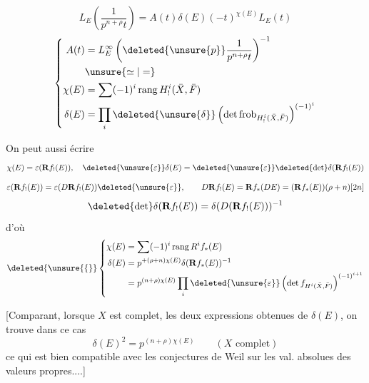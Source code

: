 \[\boxed{L_E\left(\frac1{p^{n+\rho}t}\right)=A(t)\delta(E)(-t)^{\chi(E)}L_E(t)}\]
\[
\left\{\begin{aligned}
A(t)&=L_E^\infty\left(\deleted{\unsure{p}}\frac1{p^{n+\rho}t}\right)^{-1}\\
&\unsure{\simeq|=}\\
\chi(E)&=\sum(-1)^i\operatorname{rang}H^i_!(\bar X,\bar F)\\
\delta(E)&=\prod_i\deleted{\unsure{\delta}}\left(\det\operatorname{frob}_{H^i_!(\bar X,\bar F)}\right)^{(-1)^i}
\end{aligned}\right.
\]

On peut aussi écrire
\[\chi(E)=\varepsilon(\mathbf R f_!(E)),\quad\deleted{\unsure{\varepsilon}}\delta(E)=\deleted{\unsure{\varepsilon}}\deleted{\det}\delta(\mathbf R f_!(E))\]
\[\varepsilon(\mathbf R f_!(E))=\varepsilon(D\mathbf R f_!(E))\deleted{\unsure{\varepsilon}},\qquad D\mathbf R f_!(E)=\mathbf R f_*(DE)=(\mathbf R f_*(E))(\rho+n)[2n]\]
\[\deleted{\det}\delta(\mathbf R f_!(E))=\delta(D(\mathbf R f_!(E)))^{-1}\]
d'où 
\[
\deleted{\unsure{\{}}\left\{\begin{aligned}
\chi(E)&=\sum(-1)^i\operatorname{rang}R^i f_*(E)\\
\delta(E)&=p^{+(\rho+n)\chi(E)}\delta(\mathbf R f_*(E))^{-1}\\
&=p^{(n+\rho)\chi(E)}\prod_i\deleted{\unsure{\varepsilon}}\left(\det f_{H^i(\bar X,\bar F)}\right)^{(-1)^{i+1}}
\end{aligned}\right.
\]

[Comparant, lorsque $X$ est complet, les deux expressions obtenues de $\delta(E)$, on trouve dans ce cas
\[\delta(E)^2=p^{(n+\rho)\chi(E)}\qquad(X\text{ complet})\]
ce qui est bien compatible avec les conjectures de Weil sur les val. absolues des valeurs propres....]
